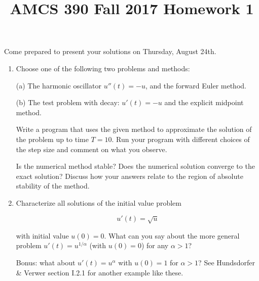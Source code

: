 \documentclass[12pt]{article}
\title{AMCS 390 Fall 2017 Homework 1}
\begin{document}
\date{}
\maketitle

Come prepared to present your solutions on Thursday, August 24th.
\begin{enumerate}

    \item   Choose one of the following two problems and methods:

            (a) The harmonic oscillator $u''(t) = -u$, and the forward Euler method.

            (b) The test problem with decay: $u'(t) = -u$ and the explicit midpoint method.

            Write a program that uses the given method to approximate the solution
            of the problem up to time $T=10$.  Run your program with different choices
            of the step size and comment on what you observe.

            Is the numerical method stable?  Does the numerical solution
            converge to the exact solution?  Discuss how your answers
            relate to the region of absolute stability of the method.

    \item   Characterize all solutions of the initial value problem

            $$u'(t) = \sqrt{u}$$

            with initial value $u(0)=0$.  What can you say about the more general
            problem $u'(t) = u^{1/\alpha}$ (with $u(0)=0$) for any $\alpha>1$?

            Bonus: what about $u'(t) = u^\alpha$ with $u(0)=1$ for $\alpha>1$?
            See Hundsdorfer \& Verwer section I.2.1 for another example like these.

\end{enumerate}
\end{document}
